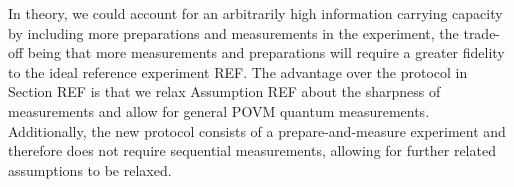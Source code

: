 In theory, we could account for an arbitrarily high information carrying capacity by including more preparations and measurements in the experiment, the trade-off being that more measurements and preparations will require a greater fidelity to the ideal reference experiment REF. The advantage over the protocol in Section REF is that we relax Assumption REF about the sharpness of measurements and allow for general POVM quantum measurements. Additionally, the new protocol consists of a prepare-and-measure experiment and therefore does not require sequential measurements, allowing for further related assumptions to be relaxed.
